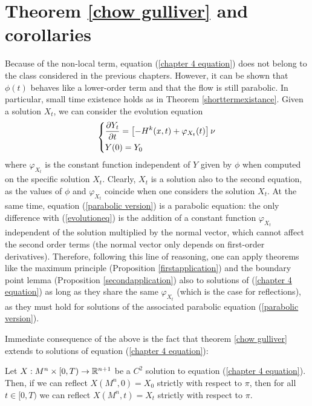 \section{Theorem \ref{chow gulliver} and corollaries}\label{Theorem CG and corollaries}

Because of the non-local term, equation (\ref{chapter 4 equation}) does not belong to the class considered in the previous chapters.
However, it can be shown that $\phi(t)$ behaves like a lower-order term and that the flow is still parabolic.
In particular, small time existence holds as in Theorem \ref{shorttermexistance}.  Given a solution $X_t$, we can consider the evolution equation 
\begin{align}
	\begin{dcases}
		\frac{\partial Y_t}{\partial t} = \left[- H^k(x, t) + \varphi_{X_t}(t)\right] \nu\\
		Y(0)= Y_0
	\end{dcases} \label{parabolic version}
\end{align}
where $\varphi_{X_t}$ is the constant function independent of $Y$ given by $\phi$ when computed on the specific solution $X_t$. 
Clearly, $X_t$ is a solution also to the second equation, as the values of  $\phi$ and $\varphi_{X_t}$ coincide when one considers the solution $X_t$. At the same time, equation (\ref{parabolic version}) is a parabolic equation: the only difference with (\ref{evolutioneq}) is the addition of a constant function $\varphi_{X_t}$ independent of the solution multiplied by the normal vector, which cannot affect the second order terms (the normal vector only depends on first-order derivatives). Therefore, following this line of reasoning, one can apply theorems like the maximum principle (Proposition \ref{firstapplication}) and the boundary point lemma (Proposition \ref{secondapplication}) also to solutions of (\ref{chapter 4 equation}) as long as they share the same $\varphi_{X_t}$ (which is the case for reflections), as they must hold for solutions of the associated parabolic equation (\ref{parabolic version}). %

Immediate consequence of the above is the fact that theorem \ref{chow gulliver} extends to solutions of equation (\ref{chapter 4 equation}):

\begin{theorem}
	Let $X:M^n\times [0,T) \rightarrow \mathbb{R}^{n+1}$ be a $C^2$ solution to equation (\ref{chapter 4 equation}). Then, if we can reflect $X(M^n, 0)=X_0$ strictly with respect to $\pi$, then for all $t\in [0,T)$ we can reflect $X(M^n, t)=X_t$ strictly with respect to $\pi$. \label{chow gulliver chapter 4}
\end{theorem}

